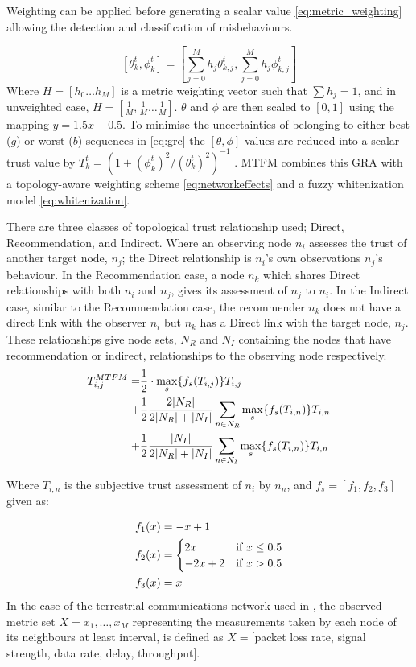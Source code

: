 \documentclass{aamas2016}
\begin{document}
Weighting can be applied before generating a scalar value \eqref{eq:metric_weighting} allowing the detection and classification of misbehaviours.

%
\begin{equation}
\label{eq:metric_weighting}
[\theta_k^t, \phi_k^t] = \left[\sum_{j=0}^M h_j \theta_{k,j}^t,\sum_{j=0}^M h_j \phi_{k,j}^t \right]
\end{equation}
%
Where $H=[h_0\dots h_M]$ is a metric weighting vector such that $\sum h_j = 1$, and in unweighted case, $H=[\frac{1}{M},\frac{1}{M}\dots\frac{1}{M}]$.
$\theta$ and $\phi$ are then scaled to $[0,1]$ using the mapping $y = 1.5 x - 0.5$.
To minimise the uncertainties of belonging to either best ($g$) or worst ($b$) sequences in \eqref{eq:grc} the $[\theta,\phi]$ values are reduced into a scalar trust value by $T_k^t = ({1+{(\phi_k^t)^2}/{(\theta_k^t)^2}})^{-1}$ \cite{Hong2010}.
MTFM combines this GRA with a topology-aware weighting scheme \eqref{eq:networkeffects} and a fuzzy whitenization model \eqref{eq:whitenization}. 

There are three classes of topological trust relationship used; Direct, Recommendation, and Indirect.
Where an observing node $n_i$ assesses the trust of another target node, $n_j$; the Direct relationship is $n_i$'s own observations $n_j$'s behaviour.
In the Recommendation case, a node $n_k$ which shares Direct relationships with both $n_i$ and $n_j$, gives its assessment of $n_j$ to $n_i$.
In the Indirect case, similar to the Recommendation case, the recommender $n_k$ does not have a direct link with the observer $n_i$ but $n_k$ has a Direct link with the target node, $n_j$.
These relationships give node sets, $N_R$ and $N_I$ containing the nodes that have recommendation or indirect, relationships to the observing node respectively.
%
\begin{align}
\label{eq:networkeffects}
T_{i,j}^{MTFM}=&\frac{1}{2} \cdot \max_s\{f_s(T_{i,j})\} T_{i,j}\\ \notag
+&\frac{1}{2} \frac{2|N_R| }{2|N_R| + |N_I|}\sum_{n \in N_R} \max_s\{f_s(T_{i,n})\} T_{i,n}\\ \notag
+&\frac{1}{2} \frac{|N_I| }{2|N_R| + |N_I|}\sum_{n \in N_I} \max_s\{f_s(T_{i,n})\} T_{i,n} 
\end{align}

Where $T_{i,n}$ is the subjective trust assessment of $n_i$ by $n_n$, and $f_s = [ f_1,f_2, f_3]$ given as:

\begin{align}
\label{eq:whitenization}
f_1(x)&= -x+1\notag\\
f_2(x)&= 
\begin{cases}
2x & \text{if }x\leq 0.5\\
-2x+2 & \text{if }x>0.5
\end{cases}\\
f_3(x)&= x\notag
\end{align}
%
In the case of the terrestrial communications network used in \cite{Guo11}, the observed metric set $X = {x_1,\dots,x_M}$ representing the measurements taken by each node of its neighbours at least interval, is defined as $X=[$packet loss rate, signal strength, data rate, delay, throughput$]$.
\end{document}
